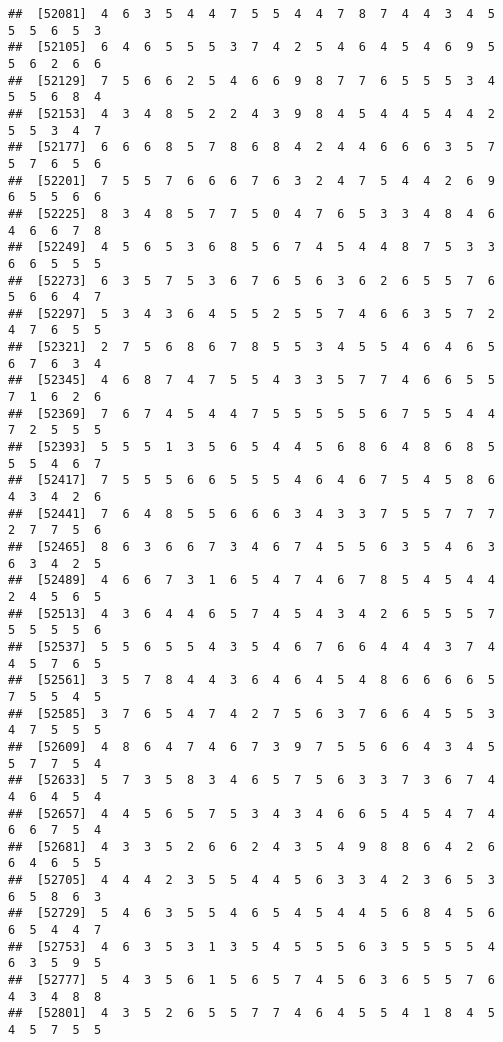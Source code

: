 \documentclass[
]{book}
\begin{document}
\begin{verbatim}
##  [52081]  4  6  3  5  4  4  7  5  5  4  4  7  8  7  4  4  3  4  5  5  5  6  5  3
##  [52105]  6  4  6  5  5  5  3  7  4  2  5  4  6  4  5  4  6  9  5  5  6  2  6  6
##  [52129]  7  5  6  6  2  5  4  6  6  9  8  7  7  6  5  5  5  3  4  5  5  6  8  4
##  [52153]  4  3  4  8  5  2  2  4  3  9  8  4  5  4  4  5  4  4  2  5  5  3  4  7
##  [52177]  6  6  6  8  5  7  8  6  8  4  2  4  4  6  6  6  3  5  7  5  7  6  5  6
##  [52201]  7  5  5  7  6  6  6  7  6  3  2  4  7  5  4  4  2  6  9  6  5  5  6  6
##  [52225]  8  3  4  8  5  7  7  5  0  4  7  6  5  3  3  4  8  4  6  4  6  6  7  8
##  [52249]  4  5  6  5  3  6  8  5  6  7  4  5  4  4  8  7  5  3  3  6  6  5  5  5
##  [52273]  6  3  5  7  5  3  6  7  6  5  6  3  6  2  6  5  5  7  6  5  6  6  4  7
##  [52297]  5  3  4  3  6  4  5  5  2  5  5  7  4  6  6  3  5  7  2  4  7  6  5  5
##  [52321]  2  7  5  6  8  6  7  8  5  5  3  4  5  5  4  6  4  6  5  6  7  6  3  4
##  [52345]  4  6  8  7  4  7  5  5  4  3  3  5  7  7  4  6  6  5  5  7  1  6  2  6
##  [52369]  7  6  7  4  5  4  4  7  5  5  5  5  5  6  7  5  5  4  4  7  2  5  5  5
##  [52393]  5  5  5  1  3  5  6  5  4  4  5  6  8  6  4  8  6  8  5  5  5  4  6  7
##  [52417]  7  5  5  5  6  6  5  5  5  4  6  4  6  7  5  4  5  8  6  4  3  4  2  6
##  [52441]  7  6  4  8  5  5  6  6  6  3  4  3  3  7  5  5  7  7  7  2  7  7  5  6
##  [52465]  8  6  3  6  6  7  3  4  6  7  4  5  5  6  3  5  4  6  3  6  3  4  2  5
##  [52489]  4  6  6  7  3  1  6  5  4  7  4  6  7  8  5  4  5  4  4  2  4  5  6  5
##  [52513]  4  3  6  4  4  6  5  7  4  5  4  3  4  2  6  5  5  5  7  5  5  5  5  6
##  [52537]  5  5  6  5  5  4  3  5  4  6  7  6  6  4  4  4  3  7  4  4  5  7  6  5
##  [52561]  3  5  7  8  4  4  3  6  4  6  4  5  4  8  6  6  6  6  5  7  5  5  4  5
##  [52585]  3  7  6  5  4  7  4  2  7  5  6  3  7  6  6  4  5  5  3  4  7  5  5  5
##  [52609]  4  8  6  4  7  4  6  7  3  9  7  5  5  6  6  4  3  4  5  5  7  7  5  4
##  [52633]  5  7  3  5  8  3  4  6  5  7  5  6  3  3  7  3  6  7  4  4  6  4  5  4
##  [52657]  4  4  5  6  5  7  5  3  4  3  4  6  6  5  4  5  4  7  4  6  6  7  5  4
##  [52681]  4  3  3  5  2  6  6  2  4  3  5  4  9  8  8  6  4  2  6  6  4  6  5  5
##  [52705]  4  4  4  2  3  5  5  4  4  5  6  3  3  4  2  3  6  5  3  6  5  8  6  3
##  [52729]  5  4  6  3  5  5  4  6  5  4  5  4  4  5  6  8  4  5  6  6  5  4  4  7
##  [52753]  4  6  3  5  3  1  3  5  4  5  5  5  6  3  5  5  5  5  4  6  3  5  9  5
##  [52777]  5  4  3  5  6  1  5  6  5  7  4  5  6  3  6  5  5  7  6  4  3  4  8  8
##  [52801]  4  3  5  2  6  5  5  7  7  4  6  4  5  5  4  1  8  4  5  4  5  7  5  5

\end{verbatim}
\end{document}
